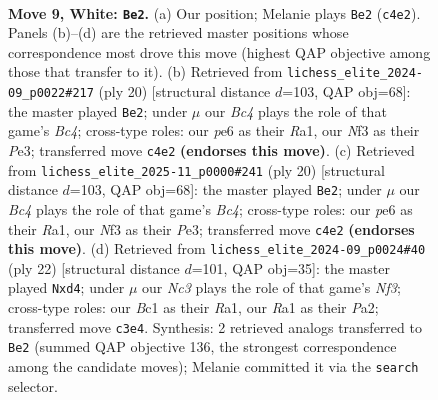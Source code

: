 \documentclass[11pt]{article}
\begin{document}
\clearpage

\begin{figure}[p]\centering
\begin{subfigure}{0.46\textwidth}\centering
\resizebox{\linewidth}{!}{%
\newchessgame
\chessboard[
  setfen={r1bq1b1r/p2nkppp/2p1pn2/1p6/2BP4/2N1PN2/PP3PPP/R1BQ1RK1 w - - 0 9},
  showmover=false,
  pgfstyle=straightmove, color=movearrow, markmove={c4-e2}
]}
\caption{}
\end{subfigure}\hfill
\begin{subfigure}{0.46\textwidth}\centering
\resizebox{\linewidth}{!}{%
\newchessgame
\chessboard[
  setfen={r1bq1rk1/p2nbpp1/2p1pn1p/1p6/2BP3B/2N1PN2/PP3PPP/R2Q1RK1 w - - 0 11},
  showmover=false,
  pgfstyle=straightmove, color=movearrow, markmove={c4-e2}
]}
\caption{}
\end{subfigure}
\\[4pt]
\begin{subfigure}{0.46\textwidth}\centering
\resizebox{\linewidth}{!}{%
\newchessgame
\chessboard[
  setfen={r1bq1rk1/p2nbpp1/2p1pn1p/1p6/2BP3B/2N1PN2/PP3PPP/R2Q1RK1 w - - 0 11},
  showmover=false,
  pgfstyle=straightmove, color=movearrow, markmove={c4-e2}
]}
\caption{}
\end{subfigure}\hfill
\begin{subfigure}{0.46\textwidth}\centering
\resizebox{\linewidth}{!}{%
\newchessgame
\chessboard[
  setfen={r1bqr1k1/pp1nppb1/5npp/8/2Np3B/3BPN2/PP2QPPP/R4RK1 w - - 0 12},
  showmover=false,
  pgfstyle=straightmove, color=movearrow, markmove={f3-d4}
]}
\caption{}
\end{subfigure}
\caption{\textbf{Move 9, White: \texttt{Be2}.} (a) Our position; Melanie plays \texttt{Be2} (\texttt{c4e2}). Panels (b)--(d) are the retrieved master positions whose correspondence most drove this move (highest QAP objective among those that transfer to it). (b) Retrieved from \texttt{lichess\_elite\_2024-09\_p0022\#217} (ply 20) [structural distance $d$=103, QAP obj=68]: the master played \texttt{Be2}; under $\mu$ our \emph{Bc4} plays the role of that game's \emph{Bc4}; cross-type roles: our \emph{p}e6 as their \emph{R}a1, our \emph{N}f3 as their \emph{P}e3; transferred move \texttt{c4e2} \textbf{(endorses this move)}. (c) Retrieved from \texttt{lichess\_elite\_2025-11\_p0000\#241} (ply 20) [structural distance $d$=103, QAP obj=68]: the master played \texttt{Be2}; under $\mu$ our \emph{Bc4} plays the role of that game's \emph{Bc4}; cross-type roles: our \emph{p}e6 as their \emph{R}a1, our \emph{N}f3 as their \emph{P}e3; transferred move \texttt{c4e2} \textbf{(endorses this move)}. (d) Retrieved from \texttt{lichess\_elite\_2024-09\_p0024\#40} (ply 22) [structural distance $d$=101, QAP obj=35]: the master played \texttt{Nxd4}; under $\mu$ our \emph{Nc3} plays the role of that game's \emph{Nf3}; cross-type roles: our \emph{B}c1 as their \emph{R}a1, our \emph{R}a1 as their \emph{P}a2; transferred move \texttt{c3e4}. Synthesis: 2 retrieved analogs transferred to \texttt{Be2} (summed QAP objective 136, the strongest correspondence among the candidate moves); Melanie committed it via the \texttt{search} selector.}
\label{fig:thought-m16}
\end{figure}
\end{document}

